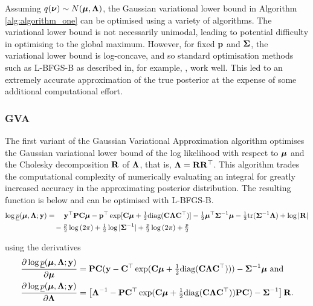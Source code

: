 \documentclass{article}[12pt]
\begin{document}

Assuming $q({\boldsymbol \nu}) \sim N({\boldsymbol \mu}, {\boldsymbol \Lambda})$, the Gaussian variational lower bound in Algorithm
\ref{alg:algorithm_one} can be optimised using a variety of algorithms. The variational lower bound is not
necessarily unimodal, leading to potential difficulty in optimising to the global maximum. However, for fixed
${\bf p}$ and ${\boldsymbol \Sigma}$, the variational lower bound is log-concave, and so standard optimisation methods such as
L-BFGS-B as described in, for example, \cite{Liu1989}, work well. This led to an extremely accurate
approximation of the true posterior at the expense of some additional computational effort.

\subsubsection{GVA}

The first variant of the Gaussian Variational Approximation algorithm optimises the Gaussian variational lower
bound of the log likelihood with respect to ${\boldsymbol \mu}$ and the Cholesky decomposition ${\bf R}$ of ${\boldsymbol \Lambda}$, that
is, ${\boldsymbol \Lambda} = {\bf R} {\bf R}^\top$. This algorithm trades the computational complexity of numerically evaluating an
integral for greatly increased accuracy in the approximating posterior distribution. The resulting function is
below and can be optimised with L-BFGS-B.
\begin{align*}
\log \underline{p}({\boldsymbol \mu}, {\boldsymbol \Lambda}; {\bf y}) &= \quad {\bf y}^\top{\bf P} {\bf C} {\boldsymbol\mu} - {\bf p}^\top \exp[{\bf C} {\boldsymbol \mu} + {\tfrac{1}{2}} \text{diag}({\bf C} {\boldsymbol \Lambda} {\bf C}^\top)] - {\tfrac{1}{2}} {\boldsymbol \mu}^\top {\boldsymbol\Sigma}^{-1} {\boldsymbol \mu} - {\tfrac{1}{2}} \text{tr}{({\boldsymbol\Sigma}^{-1} {\boldsymbol\Lambda})} + \log{|{\bf R}|} \\
&\quad - \tfrac{p}{2} \log{(2 \pi)} + {\tfrac{1}{2}} \log{|{\boldsymbol\Sigma}^{-1}|} + \tfrac{p}{2} \log{(2 \pi)} + \tfrac{p}{2} \\
\end{align*}

using the derivatives
\begin{align*}
\frac{\partial \log \underline{p}({\boldsymbol \mu}, {\boldsymbol \Lambda}; {\bf y})}{\partial {\boldsymbol\mu}} &= {\bf P} {\bf C} ({\bf y} - {\bf C}^\top \exp({\bf C} {\boldsymbol \mu} + {\tfrac{1}{2}} \text{diag}{({\bf C}{\boldsymbol\Lambda}{\bf C}^\top)})) - {\boldsymbol \Sigma}^{-1} {\boldsymbol \mu} \text{ and}\\
\frac{\partial \log \underline{p}({\boldsymbol \mu}, {\boldsymbol \Lambda}; {\bf y})}{\partial {\boldsymbol\Lambda}} &= \left [{\boldsymbol \Lambda}^{-1} - {\bf P} {\bf C}^\top \exp({\bf C} {\boldsymbol \mu} + {\tfrac{1}{2}} \text{diag}({\bf C} {\boldsymbol \Lambda} {\bf C}^\top)) {\bf P} {\bf C}) - {\boldsymbol \Sigma}^{-1} \right ] {\bf R}.
\end{align*}
\end{document}
